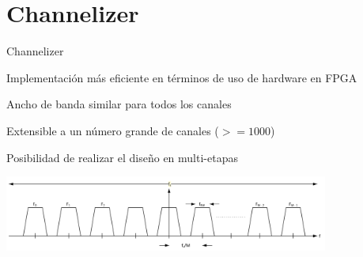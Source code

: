 \documentclass[ignorenonframetext,12pt]{beamer}
\begin{document}
\section{Channelizer}
\begin{frame}{Channelizer}

        Implementaci\'on m\'as eficiente en t\'erminos de uso de hardware en FPGA

        Ancho de banda similar para todos los canales

        Extensible a un n\'umero grande de canales ($>=1000$)

        Posibilidad de realizar el dise\~no en multi-etapas

        \begin{center}
                \includegraphics[width=0.8\textwidth]{FDM_channel_diagram}
        \end{center}
\end{frame}
\end{document}
